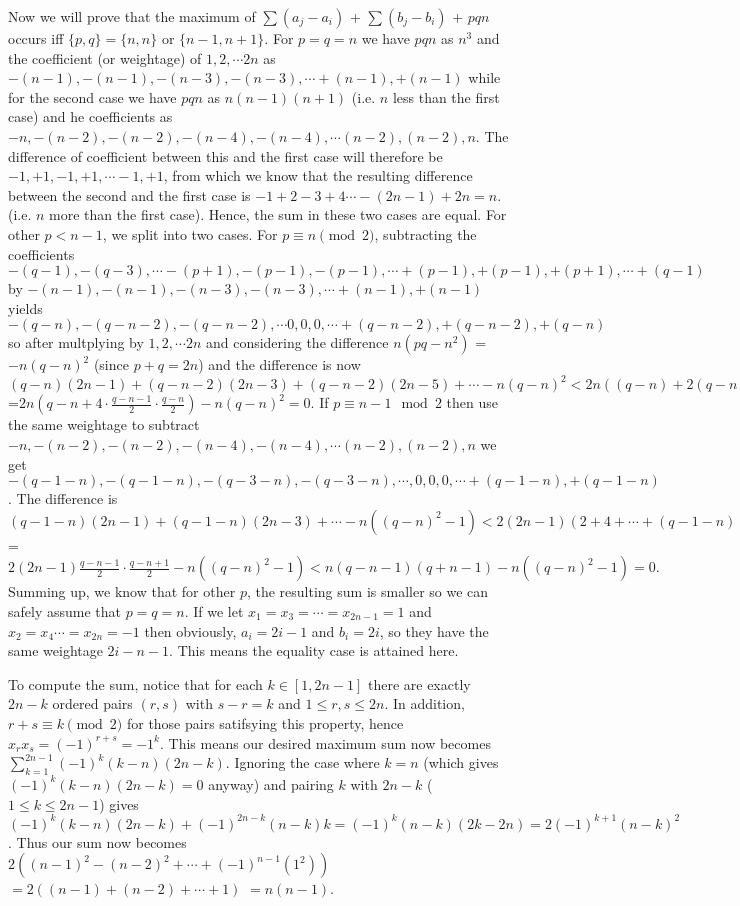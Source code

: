 \documentclass[11pt,a4paper]{article}
\begin{document}
\begin{enumerate}
Now we will prove that the maximum of $\displaystyle\sum (a_j-a_i)$ + $\displaystyle\sum (b_j-b_i)$ + $pqn$ occurs iff $\{p, q\}=\{n,n\}$ or $\{n-1, n+1\}$. For $p=q=n$ we have $pqn$ as $n^3$ and the coefficient (or weightage) of $1,2,\cdots 2n$ as $-(n-1), -(n-1), -(n-3), -(n-3),\cdots +(n-1), +(n-1)$ while for the second case we have $pqn$ as $n(n-1)(n+1)$ (i.e. $n$ less than the first case) and he coefficients as $-n, -(n-2), -(n-2), -(n-4), -(n-4),\cdots (n-2), (n-2), n$. The difference of coefficient between this and the first case will therefore be $-1, +1, -1, +1,\cdots -1, +1$, from which we know that the resulting difference between the second and the first case is $-1+2-3+4\cdots -(2n-1)+2n=n$. (i.e. $n$ more than the first case). Hence, the sum in these two cases are equal. For other $p<n-1$, we split into two cases. For $p\equiv n\pmod{2}$, subtracting the coefficients $-(q-1),-(q-3),\cdots -(p+1), -(p-1),-(p-1),\cdots +(p-1),+(p-1), +(p+1),\cdots +(q-1)$ by $-(n-1), -(n-1), -(n-3), -(n-3),\cdots +(n-1), +(n-1)$ yields $-(q-n), -(q-n-2), -(q-n-2),\cdots 0, 0, 0,\cdots +(q-n-2), +(q-n-2), +(q-n)$ so after multplying by $1,2,\cdots 2n$ and considering the difference $n(pq-n^2)$ = $-n(q-n)^2$ (since $p+q=2n$) and the difference is now $(q-n)(2n-1)+(q-n-2)(2n-3)+(q-n-2)(2n-5)+\cdots -n(q-n)^2<2n((q-n)+2(q-n-2)+2(q-n-4)+\cdots+2(2))-n(q-n)^2$=$2n(q-n+4\cdot \frac{q-n-1}{2}\cdot\frac{q-n}{2})-n(q-n)^2=0.$ If $p\equiv n-1\mod{2}$ then use the same weightage to subtract $-n, -(n-2), -(n-2), -(n-4), -(n-4),\cdots (n-2), (n-2), n$ we get $-(q-1-n), -(q-1-n), -(q-3-n), -(q-3-n),\cdots ,0,0,0,\cdots +(q-1-n), +(q-1-n)$. The difference is $(q-1-n)(2n-1)+(q-1-n)(2n-3)+\cdots -n((q-n)^2-1)<2(2n-1)(2+4+\cdots +(q-1-n))-n((q-n)^2-1)$= $2(2n-1)\frac{q-n-1}{2}\cdot\frac{q-n+1}{2}-n((q-n)^2-1)<n(q-n-1)(q+n-1)-n((q-n)^2-1)=0.$ Summing up, we know that for other $p$, the resulting sum is smaller so we can safely assume that $p=q=n$. If we let $x_1=x_3=\cdots =x_{2n-1}=1$ and $x_2=x_4\cdots =x_{2n}=-1$ then obviously, $a_i=2i-1$ and $b_i=2i$, so they have the same weightage $2i-n-1$. This means the equality case is attained here.

To compute the sum, notice that for each $k\in [1, 2n-1]$ there are exactly $2n-k$ ordered pairs $(r,s)$ with $s-r=k$ and $1\le r, s\le 2n$. 
In addition, $r+s\equiv k\pmod{2}$ for those pairs satifsying this property, hence $x_rx_s=(-1)^{r+s}={-1}^k$. 
This means our desired maximum sum now becomes
$\displaystyle\sum_{k=1}^{2n-1}(-1)^k(k-n)(2n-k)$. 
Ignoring the case where $k=n$ (which gives $(-1)^k(k-n)(2n-k)=0$ anyway) and pairing $k$ with $2n-k$ ($1\le k\le 2n-1$) gives
$(-1)^k(k-n)(2n-k)+(-1)^{2n-k}(n-k)k=(-1)^k(n-k)(2k-2n)=2(-1)^{k+1}(n-k)^2$. 
Thus our sum now becomes 
$2((n-1)^2-(n-2)^2+\cdots +(-1)^{n-1}(1^2))$
$=2((n-1)+(n-2)+\cdots + 1)$
$=n(n-1)$. 


\end{enumerate}
\end{document}
